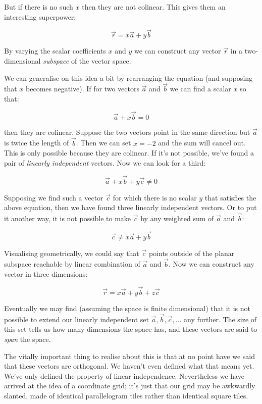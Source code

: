 But if there is no such $x$ then they are not colinear. This gives them an interesting superpower:

$$
\vec{r} = x \vec{a} + y \vec{b}
$$

By varying the scalar coefficients $x$ and $y$ we can construct any vector $\vec{r}$ in a two-dimensional \textit{subspace} of the vector space.

We can generalise on this idea a bit by rearranging the equation (and supposing that $x$ becomes negative). If for two vectors $\vec{a}$ and $\vec{b}$ we can find a scalar ${x}$ so that:

$$ 
\vec{a} + x \vec{b} = 0
$$

then they are colinear. Suppose the two vectors point in the same direction but $\vec{a}$ is twice the length of $\vec{b}$. Then we can set $x = -2$ and the sum will cancel out. This is only possible because they are colinear. If it's not possible, we've found a pair of \textit{linearly independent} vectors. Now we can look for a third:

$$ 
\vec{a} + x \vec{b} + y \vec{c} \ne 0
$$

Supposing we find such a vector $\vec{c}$ for which there is no scalar $y$ that satisfies the above equation, then we have found three linearly independent vectors. Or to put it another way, it is not possible to make $\vec{c}$ by any weighted sum of $\vec{a}$ and $\vec{b}$:

$$
\vec{c} \ne x \vec{a} + y \vec{b}
$$

Visualising geometrically, we could say that $\vec{c}$ points outside of the planar subspace reachable by linear combination of $\vec{a}$ and $\vec{b}$. Now we can construct any vector in three dimensions:

$$
\vec{r} = x \vec{a} + y \vec{b} + z \vec{c}
$$

Eventually we may find (assuming the space is finite dimensional) that it is not possible to extend our linearly independent set $\vec{a}, \vec{b}, \vec{c}, ...$ any further. The size of this set tells us how many dimensions the space has, and these vectors are said to \textit{span} the space.

The vitally important thing to realise about this is that at no point have we said that these vectors are orthogonal. We haven't even defined what that means yet. We've only defined the property of linear independence. Nevertheless we have arrived at the idea of a coordinate grid; it's just that our grid may be awkwardly slanted, made of identical parallelogram tiles rather than identical square tiles.

